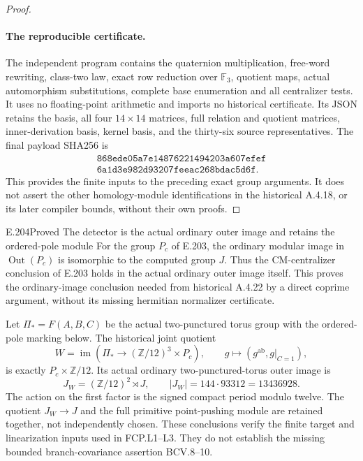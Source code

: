 \begin{proof}
\paragraph{The reproducible certificate.}
The independent program
 contains the
quaternion multiplication, free-word rewriting, class-two law,
exact row reduction over $\mathbb F_3$, quotient maps, actual
automorphism substitutions, complete base enumeration and all
centralizer tests.  It uses no floating-point arithmetic and
imports no historical certificate.  Its JSON retains the basis,
all four $14\times14$ matrices, full relation and quotient
matrices, inner-derivation basis, kernel basis, and the thirty-six
source representatives.  The final payload SHA256 is
\[
 \begin{gathered}
 \texttt{868ede05a7e14876221494203a607efef}\\[-2pt]
 \texttt{6a1d3e982d93207feeac268bdac5d6f}.
 \end{gathered}                                                   \tag{E.203.10}
\]
This provides the finite inputs to the preceding exact group
arguments.  It does not assert the other homology-module
identifications in the historical A.4.18, or its later compiler
bounds, without their own proofs.
\end{proof}

\begin{result}{E.204}{Proved}
{The detector is the actual ordinary outer image and retains the ordered-pole module}
For the group $P_c$ of E.203, the ordinary modular image in
$\operatorname{Out}(P_c)$ is isomorphic to the computed group
$J$.  Thus the CM-centralizer conclusion of E.203 holds in the
actual ordinary outer image itself.  This proves the
ordinary-image conclusion needed from historical A.4.22 by a
direct coprime argument, without its missing hermitian
normalizer certificate.

Let $\Pi_*=F(A,B,C)$ be the actual two-punctured torus group
with the ordered-pole marking below.  The historical joint
quotient
\[
 W=\operatorname{im}\left(
 \Pi_*\longrightarrow(\mathbb Z/12)^3\times P_c\right),
 \qquad g\longmapsto(g^{\mathrm{ab}},g|_{C=1}),
                                                                    \tag{E.204.1}
\]
is exactly $P_c\times\mathbb Z/12$.  Its actual ordinary
two-punctured-torus outer image is
\[
        J_W=(\mathbb Z/12)^2\rtimes J,\qquad
        |J_W|=144\cdot93312=13436928.                              \tag{E.204.2}
\]
The action on the first factor is the signed compact period
modulo twelve.  The quotient $J_W\to J$ and the full primitive
point-pushing module are retained together, not independently
chosen.  These conclusions verify the finite target and
linearization inputs used in FCP.L1--L3.  They do not establish
the missing bounded branch-covariance assertion BCV.8--10.
\end{result}

